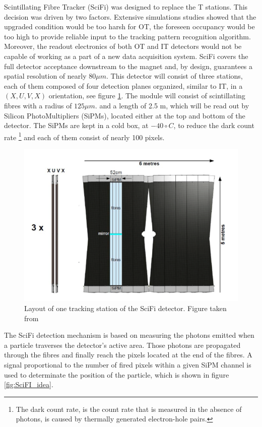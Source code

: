 Scintillating Fibre Tracker (SciFi) was designed to replace the T stations. This decision was driven by two factors. Extensive simulations studies showed that the upgraded condition would be too harsh for OT, the foreseen occupancy would be too high to provide reliable input to the tracking pattern recognition algorithm. Moreover, the readout electronics of both OT and IT detectors would not be capable of working as a part of a new data acquisition system. SciFi covers the full detector acceptance downstream to the magnet and, by design, guarantees a spatial resolution of nearly $80 \mu m$. 
This detector will consist of three stations, each of them composed of four detection planes organized, similar to IT,  in a $(X, U, V, X)$ orientation, see figure \ref{fig:SciFI}.
 The module will consist of scintillating fibres with a radius of  $125 \mu m$. and a length of 2.5 m, which will be read out by Silicon PhotoMultipliers (SiPMs), located either at the top and bottom of the detector. The SiPMs are kept in a cold box, at $-40 \circ C$, to reduce the dark count rate \footnote{The dark count rate, is the count rate that is measured in the absence of photons, is caused by thermally generated electron-hole pairs.} and each of them consist of nearly 100 pixels.   


\begin{figure}[!h]
\centering
\includegraphics[scale=0.6]{figures/SciFi.PNG}
\caption{Layout of one tracking station of the SciFi detector. Figure taken from \cite{upgrade_tracker_tdr}
\label{fig:SciFI}}
\end{figure}

The SciFi detection mechanism is based on measuring the photons emitted when a particle traverses the detector’s active area. Those photons are propagated through the fibres and finally reach the pixels located at the end of the fibres. A signal  proportional to the number of fired pixels within a given SiPM channel is used to determinate the position of the particle, which is shown in figure \ref{fig:SciFI_idea}. 


